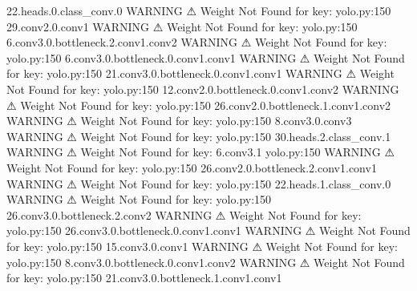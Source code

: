                              22.heads.0.class_conv.0                              
                    WARNING  ⚠ Weight Not Found for key:               yolo.py:150
                             29.conv2.0.conv1                                     
                    WARNING  ⚠ Weight Not Found for key:               yolo.py:150
                             6.conv3.0.bottleneck.2.conv1.conv2                   
                    WARNING  ⚠ Weight Not Found for key:               yolo.py:150
                             6.conv3.0.bottleneck.0.conv1.conv1                   
                    WARNING  ⚠ Weight Not Found for key:               yolo.py:150
                             21.conv3.0.bottleneck.0.conv1.conv1                  
                    WARNING  ⚠ Weight Not Found for key:               yolo.py:150
                             12.conv2.0.bottleneck.0.conv1.conv2                  
                    WARNING  ⚠ Weight Not Found for key:               yolo.py:150
                             26.conv2.0.bottleneck.1.conv1.conv2                  
                    WARNING  ⚠ Weight Not Found for key:               yolo.py:150
                             8.conv3.0.conv3                                      
                    WARNING  ⚠ Weight Not Found for key:               yolo.py:150
                             30.heads.2.class_conv.1                              
                    WARNING  ⚠ Weight Not Found for key: 6.conv3.1     yolo.py:150
                    WARNING  ⚠ Weight Not Found for key:               yolo.py:150
                             26.conv2.0.bottleneck.2.conv1.conv1                  
                    WARNING  ⚠ Weight Not Found for key:               yolo.py:150
                             22.heads.1.class_conv.0                              
                    WARNING  ⚠ Weight Not Found for key:               yolo.py:150
                             26.conv3.0.bottleneck.2.conv2                        
                    WARNING  ⚠ Weight Not Found for key:               yolo.py:150
                             26.conv3.0.bottleneck.0.conv1.conv1                  
                    WARNING  ⚠ Weight Not Found for key:               yolo.py:150
                             15.conv3.0.conv1                                     
                    WARNING  ⚠ Weight Not Found for key:               yolo.py:150
                             8.conv3.0.bottleneck.0.conv1.conv2                   
                    WARNING  ⚠ Weight Not Found for key:               yolo.py:150
                             21.conv3.0.bottleneck.1.conv1.conv1                  
